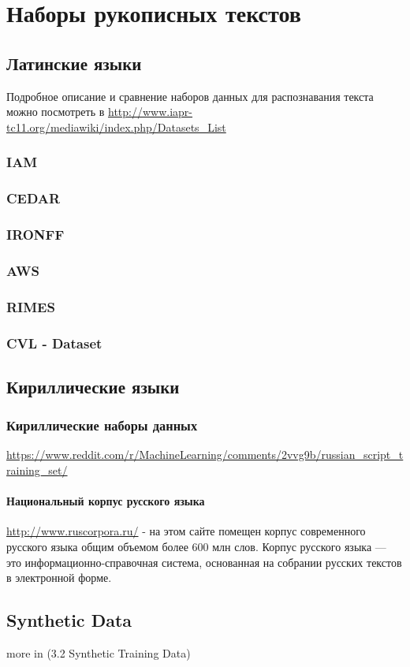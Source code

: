 \chapter{Наборы рукописных текстов}
\section{Латинские языки}

Подробное описание и сравнение наборов данных для распознавания текста можно посмотреть в \cite{hussain2015comprehensive} \url{http://www.iapr-tc11.org/mediawiki/index.php/Datasets_List}

\subsection{IAM}
\subsection{CEDAR}
\subsection{IRONFF}
\subsection{AWS}
\subsection{RIMES}
\subsection{CVL - Dataset}

\section{Кириллические языки}
\subsection{Кириллические наборы данных}

\url{https://www.reddit.com/r/MachineLearning/comments/2vvg9b/russian_script_training_set/}

\subsubsection{Национальный корпус русского языка}

\url{http://www.ruscorpora.ru/} - на этом сайте помещен корпус современного русского языка общим объемом более 600 млн слов. Корпус русского языка — это информационно-справочная система, основанная на собрании русских текстов в электронной форме.


\section{Synthetic Data}
more in \cite{bunke2003recognition} (3.2 Synthetic Training Data)
